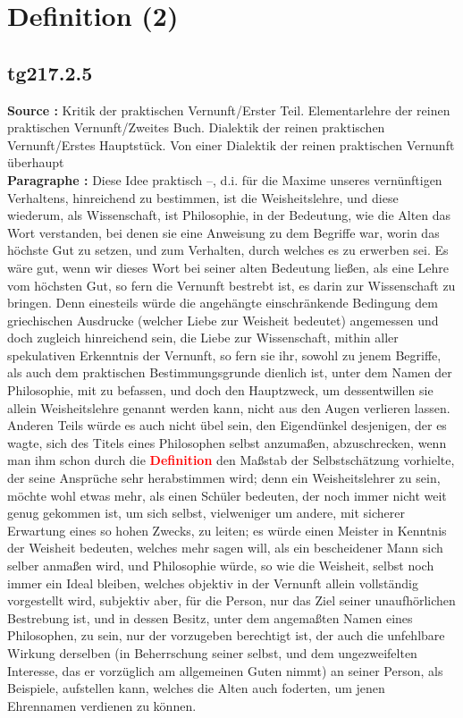 \documentclass[a4paper,12pt,twoside]{book}
\newcommand{\match}[1]{\textcolor{red}{\textbf{#1}}}
\newcommand{\unnumberedsection}[1]{
	\section*{#1}
	\addcontentsline{toc}{section}{#1}
	\markright{#1}
}
\begin{document}
	\unnumberedsection{Definition (2)} 
	\subsection*{tg217.2.5} 
	\textbf{Source : }Kritik der praktischen Vernunft/Erster Teil. Elementarlehre der reinen praktischen Vernunft/Zweites Buch. Dialektik der reinen praktischen Vernunft/Erstes Hauptstück. Von einer Dialektik der reinen praktischen Vernunft überhaupt\\  
	
	\textbf{Paragraphe : }Diese Idee praktisch –, d.i. für die Maxime unseres vernünftigen Verhaltens, hinreichend zu bestimmen, ist die 
	Weisheitslehre, und diese wiederum, als Wissenschaft, ist Philosophie, in der Bedeutung, wie die Alten das Wort verstanden, bei denen sie eine Anweisung zu dem Begriffe war, worin das höchste Gut zu setzen, und zum Verhalten, durch welches es zu erwerben sei. Es wäre gut, wenn wir dieses Wort bei seiner alten Bedeutung ließen, als eine Lehre vom höchsten Gut, so fern die Vernunft bestrebt ist, es darin zur Wissenschaft zu bringen. Denn einesteils würde die angehängte einschränkende Bedingung dem griechischen Ausdrucke (welcher Liebe zur Weisheit bedeutet) angemessen und doch zugleich hinreichend sein, die Liebe zur Wissenschaft, mithin aller spekulativen Erkenntnis der Vernunft, so fern sie ihr, sowohl zu jenem Begriffe, als auch dem praktischen Bestimmungsgrunde dienlich ist, unter dem Namen der Philosophie, mit zu befassen, und doch den Hauptzweck, um dessentwillen sie allein Weisheitslehre genannt werden kann, nicht aus den Augen verlieren lassen. Anderen Teils würde es auch nicht übel sein, den Eigendünkel desjenigen, der es wagte, sich des Titels eines Philosophen selbst anzumaßen, abzuschrecken, wenn man ihm schon durch die \match{Definition} den Maßstab der Selbstschätzung vorhielte, der seine Ansprüche sehr herabstimmen wird; denn ein Weisheitslehrer zu sein, möchte wohl etwas mehr, als einen Schüler bedeuten, der noch immer nicht weit genug gekommen ist, um sich selbst, vielweniger um andere, mit sicherer Erwartung eines so hohen Zwecks, zu leiten; es würde einen Meister in Kenntnis der Weisheit bedeuten, welches mehr sagen will, als ein bescheidener Mann sich selber anmaßen wird, und Philosophie würde, so wie die Weisheit, selbst noch immer ein Ideal bleiben, welches objektiv in der Vernunft allein vollständig vorgestellt wird, subjektiv aber, für die Person, nur das Ziel seiner unaufhörlichen Bestrebung ist, und in dessen Besitz, unter dem angemaßten Namen eines Philosophen, zu sein, nur der vorzugeben berechtigt ist, der auch die unfehlbare Wirkung derselben (in Beherrschung seiner selbst, und dem ungezweifelten Interesse, das er vorzüglich am allgemeinen Guten nimmt) an seiner Person, als Beispiele, aufstellen kann, welches die Alten auch foderten, um jenen Ehrennamen verdienen zu können. 
	
\end{document}
